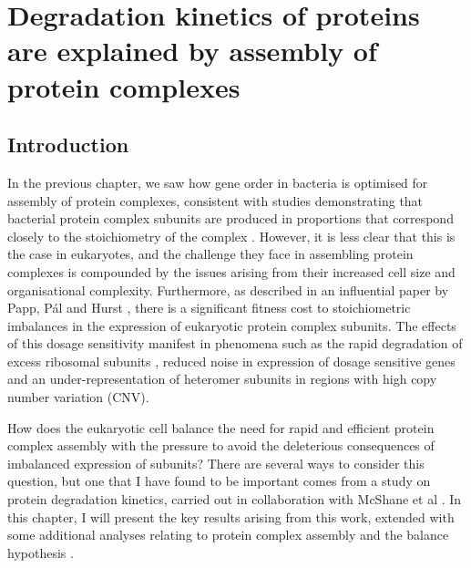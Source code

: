 \documentclass[a4paper,11pt,twoside,openright]{scrbook}
\begin{document}
\chapter{Degradation kinetics of proteins are explained by assembly of protein complexes}\label{chapter:degradation}

\section{Introduction}
In the previous chapter, we saw how gene order in bacteria is optimised for assembly of protein complexes, consistent with studies demonstrating that bacterial protein complex subunits are produced in proportions that correspond closely to the stoichiometry of the complex \cite{Li2014b,Burkhardt2017}. However, it is less clear that this is the case in eukaryotes, and the challenge they face in assembling protein complexes is compounded by the issues arising from their increased cell size and organisational complexity. Furthermore, as described in an influential paper by Papp, Pál and Hurst \cite{Papp2003}, there is a significant fitness cost to stoichiometric imbalances in the expression of eukaryotic protein complex subunits. The effects of this dosage sensitivity manifest in phenomena such as the rapid degradation of excess ribosomal subunits \cite{Warner1999,Sung2016}, reduced noise in expression of dosage sensitive genes \cite{Lehner2008} and an under-representation of heteromer subunits in regions with high copy number variation \cite{Schuster-Bockler2010} (CNV).

How does the eukaryotic cell balance the need for rapid and efficient protein complex assembly with the pressure to avoid the deleterious consequences of imbalanced expression of subunits? There are several ways to consider this question, but one that I have found to be important comes from a study on protein degradation kinetics, carried out in collaboration with McShane et al \cite{McShane2016}. In this chapter, I will present the key results arising from this work, extended with some additional analyses relating to protein complex assembly and the balance hypothesis \cite{Papp2003}.
\end{document}
